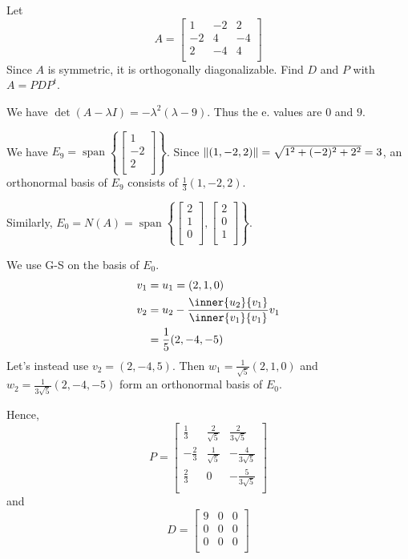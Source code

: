 \documentclass{article}
\DeclareMathOperator{\spn}{span}
\begin{document}
\begin{example}
  Let \[
    A =
    \begin{bmatrix}
      1  & -2 & 2  \\
      -2 & 4  & -4 \\
      2  & -4 & 4  \\
    \end{bmatrix}
  \]
  Since $A$ is symmetric, it is orthogonally diagonalizable. Find $D$ and $P$ with $A = PDP^t$.

  We have $\det (A - \lambda I) = -\lambda^2(\lambda-9)$. Thus the e. values are $0$ and $9$.

  We have $E_9 = \spn \left\{
    \begin{bmatrix}
      1 \\-2\\2\\
    \end{bmatrix}\right\}$. Since $\norm{(1, -2, 2)} = \sqrt{1^2 + (-2)^2 + 2^2} = 3$, an orthonormal basis of $E_9$ consists of $\frac{1}{3}(1, -2, 2)$.

  Similarly, $E_0 = N(A) = \spn \left\{
    \begin{bmatrix}
      2 \\1\\0\\
    \end{bmatrix},
    \begin{bmatrix}
      2 \\0\\1\\
    \end{bmatrix}\right\}$.

  We use G-S on the basis of $E_0$.
  \begin{align*}
    v_1 & = u_1 = (2, 1, 0)                                    \\
    v_2 & = u_2 - \frac{\inner{u_2}{v_1}}{\inner{v_1}{v_1}}v_1 \\
        & = \frac{1}{5}(2, -4, -5)
  \end{align*}
  Let's instead use $v_2 = (2, -4, 5)$. Then $w_1 = \frac{1}{\sqrt{5}}(2, 1, 0)$ and $w_2 = \frac{1}{3\sqrt{5}}(2, -4, -5)$ form an orthonormal basis of $E_0$.

  Hence,
  \[
    P =
    \begin{bmatrix}
      \frac{1}{3}  & \frac{2}{\sqrt{5}} & \frac{2}{3\sqrt{5}}  \\
      -\frac{2}{3} & \frac{1}{\sqrt{5}} & -\frac{4}{3\sqrt{5}} \\
      \frac{2}{3}  & 0                  & -\frac{5}{3\sqrt{5}} \\
    \end{bmatrix}
  \] and \[
    D =
    \begin{bmatrix}
      9 & 0 & 0 \\
      0 & 0 & 0 \\
      0 & 0 & 0 \\
    \end{bmatrix}
  \]
\end{example}
\end{document}
